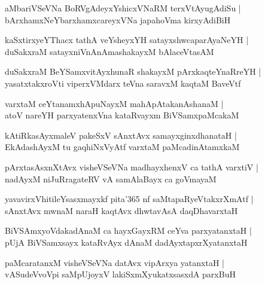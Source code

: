 \documentclass[twoside,12pt,openright]{book}
\newcounter{shloka}[chapter]
\begin{document}
\begin{shloka}%
aMbariVSeVNa BoRVgAdeyxYshicxVNaRM terxVtAyugAdiSu |\\
bArxhamxNeYbarxhamxcareyxVNa japahoVma kirxyAdiBiH 
\end{shloka}

\begin{shloka}%
kaSxtirxyeYThacx tathA veYsheyxYH satayxshwcaparAyaNeYH |\\
duSakxraM satayxniVnAnAmashakayxM bAlaceVtasAM 
\end{shloka}

\begin{shloka}%
duSakxraM BeYSamxvitAyxhunaR shakayxM pArxkaqteYnaRreYH |\\
yasatxtakxroVti viperxVMdarx teVna saravxM kaqtaM BaveVtf 
\end{shloka}

\begin{shloka}%
varxtaM ceYtanamxhApuNayxM mahApAtakanAshanaM |\\
atoV nareYH parxyatenxVna kataRvayxm BiVSamxpaMcakaM 
\end{shloka}

\begin{shloka}%
kAtiRkasAyxmaleV pakeSxV sAnxtAvx samayxginxdhanataH |\\
EkAdashAyxM tu gaqhiNxVyAtf varxtaM paMcadinAtamxkaM 
\end{shloka}

\begin{shloka}%
pArxtasAsxnXtAvx visheVSeVNa madhayxhenxV ca tathA varxtiV |\\
nadAyxM niJuRragateRV vA samAlaBayx ca goVmayaM 
\end{shloka}

\begin{shloka}%
yavavirxVhitileYsasxmayxkf pita\char'365 nf saMtapaRyeVtakxrXmAtf |\\
sAnxtAvx mwnaM naraH kaqtAvx dhwtavAsA daqDhavarxtaH 
\end{shloka}

\begin{shloka}%
BiVSAmxyoVdakadAnaM ca hayxGayxRM ceYva parxyatanxtaH |\\
pUjA BiVSamxsayx kataRvAyx dAnaM dadAyxtapxrXyatanxtaH 
\end{shloka}

\begin{shloka}%
paMcaratanxM visheVSeVNa datAvx vipArxya yatanxtaH |\\
vASudeVvoVpi saMpUjoyxV lakiSxmXyukatxsasxdA parxBuH
\end{shloka}
\end{document}
